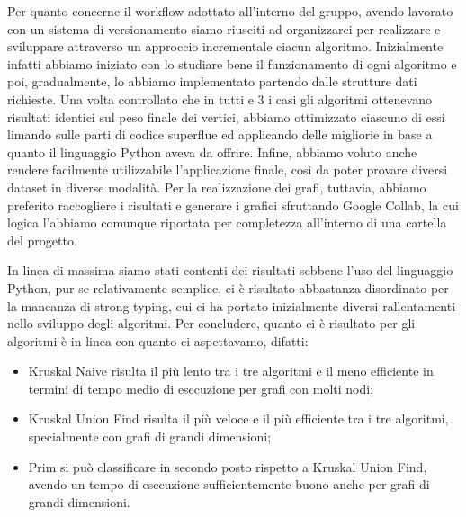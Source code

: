 Per quanto concerne il workflow adottato all'interno del gruppo, avendo lavorato con un sistema di versionamento siamo riusciti ad organizzarci per realizzare e sviluppare attraverso un approccio incrementale ciacun algoritmo. Inizialmente infatti abbiamo iniziato con lo studiare bene il funzionamento di ogni algoritmo e poi, gradualmente, lo abbiamo implementato partendo dalle strutture dati richieste. Una volta controllato che in tutti e 3 i casi gli algoritmi ottenevano risultati identici sul peso finale dei vertici, abbiamo ottimizzato ciascuno di essi limando sulle parti di codice superflue ed applicando delle migliorie in base a quanto il linguaggio Python aveva da offrire. Infine, abbiamo voluto anche rendere facilmente utilizzabile l'applicazione finale, così da poter provare diversi dataset in diverse modalità. Per la realizzazione dei grafi, tuttavia, abbiamo preferito raccogliere i risultati e generare i grafici sfruttando Google Collab, la cui logica l'abbiamo comunque riportata per completezza all'interno di una cartella del progetto.





In linea di massima siamo stati contenti dei risultati sebbene l'uso del linguaggio Python, pur se relativamente semplice, ci è risultato abbastanza disordinato per la mancanza di strong typing, cui ci ha portato inizialmente diversi rallentamenti nello sviluppo degli algoritmi.
Per concludere, quanto ci è risultato per gli algoritmi è in linea con quanto ci aspettavamo, difatti: 
\begin{itemize}
    \item Kruskal Naive risulta il più lento tra i tre algoritmi e il meno efficiente in termini di tempo medio di esecuzione per grafi con molti nodi;
    \item Kruskal Union Find risulta il più veloce e il più efficiente tra i tre algoritmi, specialmente con grafi di grandi dimensioni;
    \item Prim si può classificare in secondo posto rispetto a Kruskal Union Find, avendo un tempo di esecuzione sufficientemente buono anche per grafi di grandi dimensioni. 
\end{itemize}


